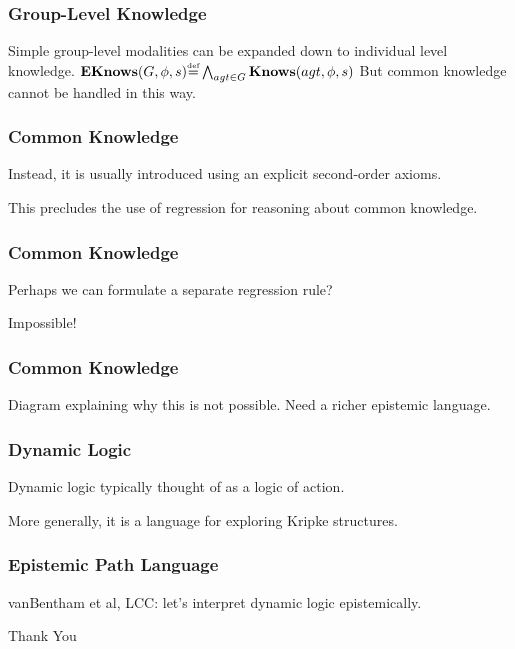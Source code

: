 \documentclass[compress]{beamer}
\newcommand{\isdef}{\hbox{$\stackrel{\mbox{\tiny def}}{=}$}}
\newcommand{\EKnows}{\mathbf{EKnows}}
\newcommand{\Knows}{\mathbf{Knows}}
\begin{document}
\begin{frame}
\frametitle{Group-Level Knowledge}
Simple group-level modalities can be expanded down to individual level knowledge.
$\EKnows(G,\phi,s) \isdef \bigwedge_{agt \in G} \Knows(agt,\phi,s)$
But common knowledge cannot be handled in this way.
\end{frame}

\begin{frame}
\frametitle{Common Knowledge}
Instead, it is usually introduced using an explicit second-order axioms.

This precludes the use of regression for reasoning about common knowledge.
\end{frame}

\begin{frame}
\frametitle{Common Knowledge}
Perhaps we can formulate a separate regression rule?
 
Impossible!
\end{frame}

\begin{frame}
\frametitle{Common Knowledge}
Diagram explaining why this is not possible.
Need a richer epistemic language.
\end{frame}

\begin{frame}
\frametitle{Dynamic Logic}
Dynamic logic typically thought of as a logic of action.

More generally, it is a language for exploring Kripke structures.
\end{frame}

\begin{frame}
\frametitle{Epistemic Path Language}
vanBentham et al, LCC: let's interpret dynamic logic epistemically.
\end{frame}


\begin{frame}
\centering \large Thank You\\
\end{frame}
\end{document}
